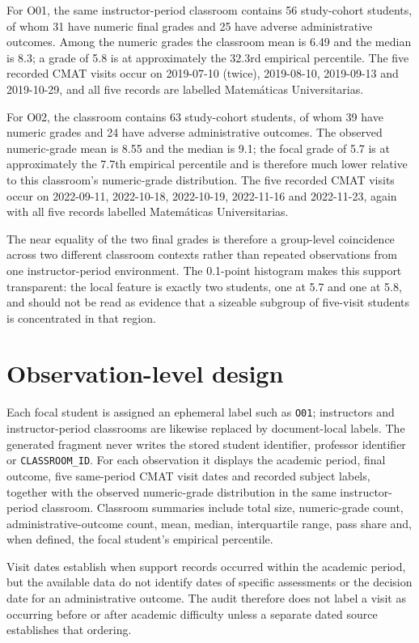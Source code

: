 \documentclass[11pt]{article}
\begin{document}
For O01, the same instructor-period classroom contains 56 study-cohort students, of whom 31 have numeric final grades and 25 have adverse administrative outcomes. Among the numeric grades the classroom mean is 6.49 and the median is 8.3; a grade of 5.8 is at approximately the 32.3rd empirical percentile. The five recorded CMAT visits occur on 2019-07-10 (twice), 2019-08-10, 2019-09-13 and 2019-10-29, and all five records are labelled Matem\'aticas Universitarias.

For O02, the classroom contains 63 study-cohort students, of whom 39 have numeric grades and 24 have adverse administrative outcomes. The observed numeric-grade mean is 8.55 and the median is 9.1; the focal grade of 5.7 is at approximately the 7.7th empirical percentile and is therefore much lower relative to this classroom's numeric-grade distribution. The five recorded CMAT visits occur on 2022-09-11, 2022-10-18, 2022-10-19, 2022-11-16 and 2022-11-23, again with all five records labelled Matem\'aticas Universitarias.

The near equality of the two final grades is therefore a group-level coincidence across two different classroom contexts rather than repeated observations from one instructor-period environment. The 0.1-point histogram makes this support transparent: the local feature is exactly two students, one at 5.7 and one at 5.8, and should not be read as evidence that a sizeable subgroup of five-visit students is concentrated in that region.

\section{Observation-level design}
Each focal student is assigned an ephemeral label such as \texttt{O01}; instructors and instructor-period classrooms are likewise replaced by document-local labels. The generated fragment never writes the stored student identifier, professor identifier or \texttt{CLASSROOM\_ID}. For each observation it displays the academic period, final outcome, five same-period CMAT visit dates and recorded subject labels, together with the observed numeric-grade distribution in the same instructor-period classroom. Classroom summaries include total size, numeric-grade count, administrative-outcome count, mean, median, interquartile range, pass share and, when defined, the focal student's empirical percentile.

Visit dates establish when support records occurred within the academic period, but the available data do not identify dates of specific assessments or the decision date for an administrative outcome. The audit therefore does not label a visit as occurring before or after academic difficulty unless a separate dated source establishes that ordering.
\end{document}

